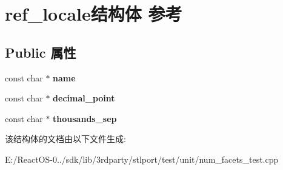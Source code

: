 \hypertarget{structref__locale}{}\section{ref\+\_\+locale结构体 参考}
\label{structref__locale}
\subsection*{Public 属性}
\begin{DoxyCompactItemize}
\item 
\mbox{\label{structref__locale_a68e7cbe49939be8f1f4073e7148238c3}} 
const char $\ast$ {\bfseries name}
\item 
\mbox{\label{structref__locale_a705609215a9992b833dd003d4cba6ebf}} 
const char $\ast$ {\bfseries decimal\+\_\+point}
\item 
\mbox{\label{structref__locale_a5d509e7e45143bb2954c4c2360c7e272}} 
const char $\ast$ {\bfseries thousands\+\_\+sep}
\end{DoxyCompactItemize}


该结构体的文档由以下文件生成\+:\begin{DoxyCompactItemize}
\item 
E\+:/\+React\+O\+S-\/0../sdk/lib/3rdparty/stlport/test/unit/num\+\_\+facets\+\_\+test.\+cpp\end{DoxyCompactItemize}
